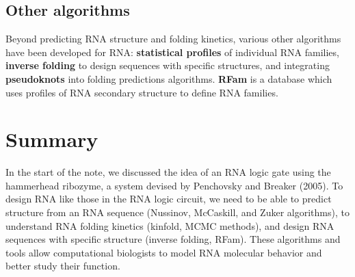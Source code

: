 \documentclass[12pt]{article}
\begin{document}
\subsection{Other algorithms}
Beyond predicting RNA structure and folding kinetics, various other algorithms have been developed for RNA: \textbf{statistical profiles} of individual RNA families, \textbf{inverse folding} to design sequences with specific structures, and integrating \textbf{pseudoknots} into folding predictions algorithms. \textbf{RFam} is a database which uses profiles of  RNA secondary structure to define RNA families.
\section{Summary}
In the start of the note, we discussed the idea of an RNA logic gate using the hammerhead ribozyme, a system devised by Penchovsky and Breaker (2005). To design RNA like those in the RNA logic circuit, we need to be able to predict structure from an RNA sequence (Nussinov, McCaskill, and Zuker algorithms), to understand RNA folding kinetics (kinfold, MCMC methods), and design RNA sequences with specific structure (inverse folding, RFam). These algorithms and tools allow computational biologists to model RNA molecular behavior and better study their function.
\end{document}
